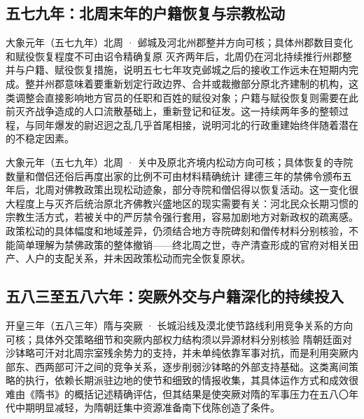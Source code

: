 \subsection{五七九年：北周末年的户籍恢复与宗教松动}

\begin{event}{}{大象元年（五七九年）}{北周 · 邺城及河北州郡}{整并方向可核；具体州郡数目变化和赋役恢复程度不可由诏令精确复原}
灭齐两年后，北周仍在河北持续推行州郡整并与户籍、赋役恢复措施，说明五七七年攻克邺城之后的接收工作远未在短期内完成。整并州郡意味着要重新划定行政边界、合并或裁撤部分原北齐建制的机构，这类调整会直接影响地方官员的任职和百姓的赋役对象；户籍与赋役恢复则需要在此前灭齐战争造成的人口流散基础上，重新登记和征发。这一持续两年多的整顿过程，与同年爆发的尉迟迥之乱几乎首尾相接，说明河北的行政重建始终伴随着潜在的不稳定因素。
\end{event}

\begin{event}{}{大象元年（五七九年）}{北周 · 关中及原北齐境内}{松动方向可核；具体恢复的寺院数量和僧侣还俗后再度出家的比例不可由材料精确统计}
建德三年的禁佛令颁布五年后，北周对佛教政策出现松动迹象，部分寺院和僧侣得以恢复活动。这一变化很大程度上与灭齐后统治原北齐佛教兴盛地区的现实需要有关：河北民众长期习惯的宗教生活方式，若被关中的严厉禁令强行套用，容易加剧地方对新政权的疏离感。政策松动的具体幅度和地域差异，仍须结合地方寺院碑刻和僧传材料分别核验，不能简单理解为禁佛政策的整体撤销——终北周之世，寺产清查形成的官府对相关田产、人户的支配关系，并未因政策松动而完全恢复原状。
\end{event}

\subsection{五八三至五八六年：突厥外交与户籍深化的持续投入}

\begin{event}{}{开皇三年（五八三年）}{隋与突厥 · 长城沿线及漠北使节路线}{利用竞争关系的方向可核；具体外交策略细节和突厥内部权力结构须以异源材料分别核验}
隋朝廷面对沙钵略可汗对北周宗室残余势力的支持，并未单纯依靠军事对抗，而是利用突厥内部东、西两部可汗之间的竞争关系，逐步削弱沙钵略的外部支持基础。这类离间策略的执行，依赖长期派驻边地的使节和细致的情报收集，其具体运作方式和成效很难由《隋书》的概括记述精确评估，但其结果是使突厥对隋的军事压力在五八〇年代中期明显减轻，为隋朝廷集中资源准备南下伐陈创造了条件。
\end{event}

